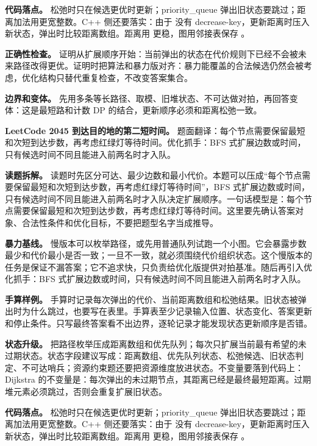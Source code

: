 \textbf{代码落点。} 松弛时只在候选更优时更新；priority\_queue 弹出旧状态要跳过；距离加法用更宽整数。C++ 侧还要落实：由于  没有 decrease-key，更新距离时压入新状态，弹出时比较距离数组。距离用  更稳，图用邻接表保存 。

\textbf{正确性检查。} 证明从扩展顺序开始：当前弹出的状态在代价规则下已经不会被未来路径改得更优。证明时把算法和暴力版对齐：暴力能覆盖的合法候选仍然会被考虑，优化结构只替代重复检查，不改变答案集合。

\textbf{边界和变体。} 先用多条等长路径、取模、旧堆状态、不可达做对拍，再回答变体：这是最短路和计数 DP 的结合，更新顺序必须和距离松弛一致。

\noindent\textbf{LeetCode 2045 到达目的地的第二短时间。} 题面翻译：每个节点需要保留最短和次短到达步数，再考虑红绿灯等待时间。优化抓手：BFS 式扩展边数或时间，只有候选时间不同且能进入前两名时才入队。

\textbf{读题拆解。} 读题时先区分可达、最少边数和最小代价。本题可以压成“每个节点需要保留最短和次短到达步数，再考虑红绿灯等待时间”，BFS 式扩展边数或时间，只有候选时间不同且能进入前两名时才入队决定扩展顺序。一句话模型是：每个节点需要保留最短和次短到达步数，再考虑红绿灯等待时间。这里要先确认答案对象、合法性条件和优化目标，不要把题型名字当成推导。

\textbf{暴力基线。} 慢版本可以枚举路径，或先用普通队列试跑一个小图。它会暴露步数最少和代价最小是否一致；一旦不一致，就必须围绕代价组织状态。这个慢版本的任务是保证不漏答案；它不追求快，只负责给优化版提供对拍基准。随后再引入优化抓手：BFS 式扩展边数或时间，只有候选时间不同且能进入前两名时才入队。

\textbf{手算样例。} 手算时记录每次弹出的代价、当前距离数组和松弛结果。旧状态被弹出时为什么跳过，也要写在表里。手算表至少记录输入位置、状态变化、答案更新和停止条件。只写最终答案看不出边界，逐轮记录才能发现状态更新顺序是否错。

\textbf{状态升级。} 把路径枚举压成距离数组和优先队列；每次只扩展当前最有希望的未过期状态。状态字段建议写成：距离数组、优先队列状态、松弛候选、旧状态判定、不可达哨兵；资源约束题还要把资源维度放进状态。不变量要落到代码上：Dijkstra 的不变量是：每次弹出的未过期节点，其距离已经是最终最短距离。过期堆元素必须跳过，否则会重复扩展旧状态。

\textbf{代码落点。} 松弛时只在候选更优时更新；priority\_queue 弹出旧状态要跳过；距离加法用更宽整数。C++ 侧还要落实：由于  没有 decrease-key，更新距离时压入新状态，弹出时比较距离数组。距离用  更稳，图用邻接表保存 。

